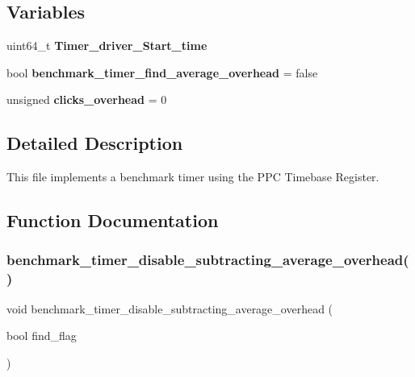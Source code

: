 \subsection*{Variables}
\begin{DoxyCompactItemize}
\item 
\mbox{\label{btimer-ppc-dec_8c_a2253a347d776ef4d1960eff549e4aad5}} 
uint64\+\_\+t {\bfseries Timer\+\_\+driver\+\_\+\+Start\+\_\+time}
\item 
\mbox{\label{btimer-ppc-dec_8c_aff7592371a0cc40ceba40a1adf11bbc0}} 
bool {\bfseries benchmark\+\_\+timer\+\_\+find\+\_\+average\+\_\+overhead} = false
\item 
\mbox{\label{btimer-ppc-dec_8c_aaa7cc82b3f37bbb5c80032c17ab4c11d}} 
unsigned {\bfseries clicks\+\_\+overhead} = 0
\end{DoxyCompactItemize}


\subsection{Detailed Description}
This file implements a benchmark timer using the P\+PC Timebase Register. 



\subsection{Function Documentation}
\mbox{\label{btimer-ppc-dec_8c_af3b4e28a2f0f7870be848a1d5cee0d03}} 
\subsubsection{\texorpdfstring{benchmark\_timer\_disable\_subtracting\_average\_overhead()}{benchmark\_timer\_disable\_subtracting\_average\_overhead()}}
{\footnotesize\ttfamily void benchmark\+\_\+timer\+\_\+disable\+\_\+subtracting\+\_\+average\+\_\+overhead (\begin{DoxyParamCaption}\item[{bool}]{find\+\_\+flag }\end{DoxyParamCaption})}



